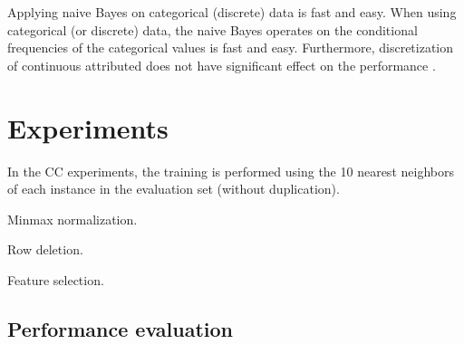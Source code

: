 \documentclass{sig-alternate}
\begin{document}
Applying naive Bayes on categorical (discrete) data is fast and easy. 
When using categorical (or discrete) data, the naive Bayes operates on the conditional frequencies of 
the categorical values is fast and easy. Furthermore, discretization of continuous attributed does not 
have significant effect on the performance \cite{Dougherty95}.


\section{Experiments}
In the CC experiments, the training is performed using the 10 nearest neighbors of each instance in the 
evaluation set (without duplication). 

Minmax normalization.

Row deletion.

Feature selection.

\subsection{Performance evaluation}




%
%
\appendix
\end{document}
